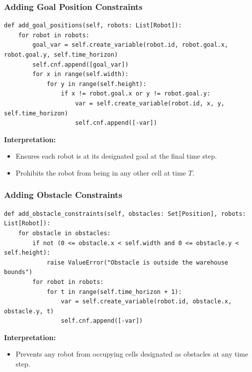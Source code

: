 \documentclass[8pt]{article}
\begin{document}
\subsubsection*{Adding Goal Position Constraints}
\begin{lstlisting}
def add_goal_positions(self, robots: List[Robot]):
    for robot in robots:
        goal_var = self.create_variable(robot.id, robot.goal.x, robot.goal.y, self.time_horizon)
        self.cnf.append([goal_var])
        for x in range(self.width):
            for y in range(self.height):
                if x != robot.goal.x or y != robot.goal.y:
                    var = self.create_variable(robot.id, x, y, self.time_horizon)
                    self.cnf.append([-var])
\end{lstlisting}

\textbf{Interpretation:}
\begin{itemize}
    \item Ensures each robot is at its designated goal at the final time step.
    \item Prohibits the robot from being in any other cell at time $T$.
\end{itemize}

\subsubsection*{Adding Obstacle Constraints}
\begin{lstlisting}
def add_obstacle_constraints(self, obstacles: Set[Position], robots: List[Robot]):
    for obstacle in obstacles:
        if not (0 <= obstacle.x < self.width and 0 <= obstacle.y < self.height):
            raise ValueError("Obstacle is outside the warehouse bounds")
        for robot in robots:
            for t in range(self.time_horizon + 1):
                var = self.create_variable(robot.id, obstacle.x, obstacle.y, t)
                self.cnf.append([-var])
\end{lstlisting}

\textbf{Interpretation:}
\begin{itemize}
    \item Prevents any robot from occupying cells designated as obstacles at any time step.
\end{itemize}
\end{document}
